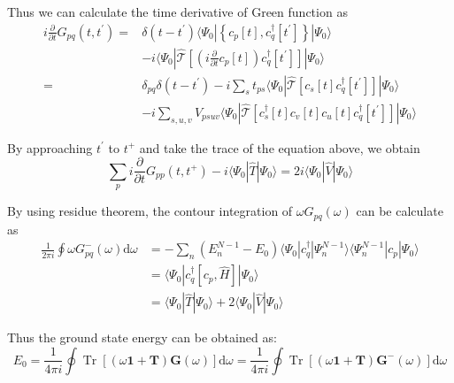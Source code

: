 Thus we can calculate the time derivative of Green function as
\begin{equation}
\begin{aligned}
i \frac{\partial}{\partial t} G_{p q}\left(t, t^{\prime}\right)
=& \delta\left(t-t^{\prime}\right)\langle\Psi_{0} |\left\{c_{p}[t], c_{q}^{\dagger}\left[t^{\prime}\right]\right\}| \Psi_{0} \rangle
\\
&-i\langle\Psi_{0}|\hat{\mathcal{T}}\left[\left(i \frac{\partial}{\partial t} c_{p}[t]\right) c_{q}^{\dagger}\left[t^{\prime}\right]\right]| \Psi_{0}\rangle 
\\
=& \delta_{p q} \delta\left(t-t^{\prime}\right)-i \sum_{s} t_{p s}\langle\Psi_{0}|\hat{\mathcal{T}}\left[c_{s}[t] c_{q}^{\dagger}\left[t^{\prime}\right]\right]| \Psi_{0}\rangle 
\\
&- i \sum_{s, u, v} V_{p s u v}\langle\Psi_{0}|\hat{\mathcal{T}}\left[c_{s}^{\dagger}[t] c_{v}[t] c_{u}[t] c_{q}^{\dagger}\left[t^{\prime}\right]\right]| \Psi_{0}\rangle \end{aligned}
\end{equation}

By approaching $t^{\prime}$ to $t^{+}$ and take the trace of the equation above, we obtain
\begin{equation}
\sum_{p} i \frac{\partial}{\partial t} G_{p p}\left(t, t^{+}\right)-i\langle\Psi_{0}|\hat{T}| \Psi_{0}\rangle= 2 i\langle\Psi_{0}|\hat{V}| \Psi_{0}\rangle
\end{equation}

By using residue theorem, the contour integration of $\omega G_{pq}(\omega)$ can be calculate as
\begin{equation}
\begin{aligned}
	\frac{1}{2 \pi i} \oint \omega G_{p q}^{-}(\omega) \mathrm{d} \omega
	&=-\sum_{n}\left(E_{n}^{N-1}-E_{0}\right)\langle\Psi_{0}|c_{q}^{\dagger}| \Psi_{n}^{N-1}\rangle\langle\Psi_{n}^{N-1}|c_{p}| \Psi_{0}\rangle
\\ 
&=\langle\Psi_{0}|c_{q}^{\dagger}\left[c_{p}, \hat{H}\right]| \Psi_{0}\rangle
\\
	&=\langle\Psi_{0}|\hat{T}| \Psi_{0}\rangle+ 2\langle\Psi_{0}|\hat{V}| \Psi_{0}\rangle
\end{aligned}
\end{equation}

Thus the ground state energy can be obtained as:
\begin{equation} \label{greenenergy}
E_{0}=\frac{1}{4 \pi i} \oint \operatorname{Tr}[(\omega \mathbf{1}+\boldsymbol{T}) \boldsymbol{G}(\omega)] \mathrm{d} \omega=\frac{1}{4 \pi i} \oint \operatorname{Tr}\left[(\omega \mathbf{1}+\boldsymbol{T}) \boldsymbol{G}^{-}(\omega)\right] \mathrm{d} \omega
\end{equation}

